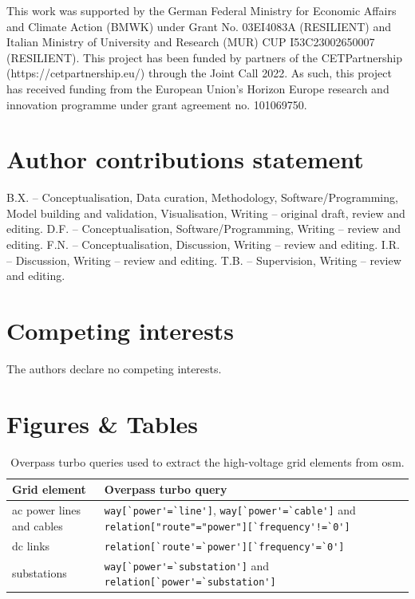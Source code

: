 \documentclass[fleqn,10pt]{wlscirep}
\newcommand{\colorcode}[1]{\colorbox{gray!20}{\lstinline|#1|}}
\begin{document}
This work was supported by the German Federal Ministry for Economic Affairs and Climate Action (BMWK) under Grant No. 03EI4083A (RESILIENT) and Italian Ministry of University and Research (MUR) CUP I53C23002650007 (RESILIENT). This project has been funded by partners of the CETPartnership (https://cetpartnership.eu/) through the Joint Call 2022. As such, this project has received funding from the European Union's Horizon Europe research and innovation programme under grant agreement no. 101069750.

\section*{Author contributions statement}
B.X. -- Conceptualisation, Data curation, Methodology, Software/Programming, Model building and validation, Visualisation, Writing -- original draft, review and editing. 
D.F. -- Conceptualisation, Software/Programming, Writing -- review and editing.
F.N. -- Conceptualisation, Discussion, Writing -- review and editing.
I.R. -- Discussion, Writing -- review and editing.
T.B. -- Supervision, Writing -- review and editing.

\section*{Competing interests} %
The authors declare no competing interests.

\newpage
\section*{Figures \& Tables}

\begin{table}[!htbp]
    \centering
    \begin{tabular}{|p{}|p{}|}
    \hline
    \textbf{Grid element} & \textbf{Overpass turbo query}  \\
    \hline
    \acrshort{ac} power lines and cables & \colorcode{way[`power'=`line']}, \colorcode{way[`power'=`cable']} \newline and \colorcode{relation["route"="power"][`frequency'!=`0']} \\
    \hline
    \acrshort{dc} links & \colorcode{relation[`route'=`power'][`frequency'=`0']} \\
    \hline
    substations & \colorcode{way[`power'=`substation']} and \colorcode{relation[`power'=`substation']} \\
    \hline
    \end{tabular}
    \caption{Overpass turbo queries used to extract the high-voltage grid elements from \acrshort{osm}.}
    \label{tab:overpass_queries}
\end{table}
\end{document}
